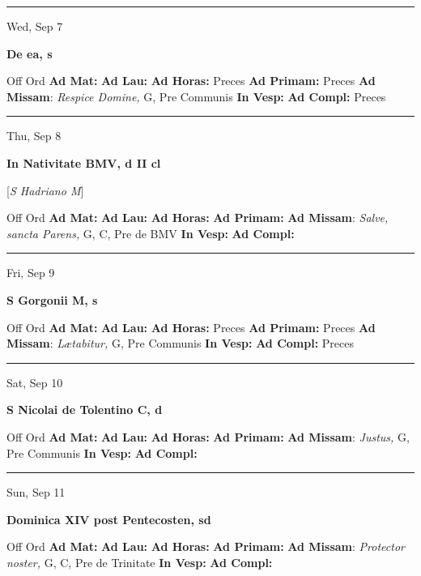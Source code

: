 \documentclass[letterpaper, 10pt]{article}
\begin{document}
\hrule
\begin{center}
Wed, Sep 7
\end{center}\textbf{ \large De ea, \textnormal{\normalsize s}}
\begin{justify}
Off Ord
\textbf{Ad Mat: }
\textbf{Ad Lau: }
\textbf{Ad Horas: }Preces
\textbf{Ad Primam: }Preces
\textbf{Ad Missam}: \textit{Respice Domine,} G, Pre Communis
\textbf{In Vesp: }
\textbf{Ad Compl: }Preces\end{justify}



\hrule
\begin{center}
Thu, Sep 8
\end{center}\textbf{ \large In Nativitate BMV, \textnormal{\normalsize d II cl}}

[\textit{S Hadriano M}]
\begin{justify}
Off Ord
\textbf{Ad Mat: }
\textbf{Ad Lau: }
\textbf{Ad Horas: }
\textbf{Ad Primam: }
\textbf{Ad Missam}: \textit{Salve, sancta Parens,} G, C, Pre de BMV
\textbf{In Vesp: }
\textbf{Ad Compl: }\end{justify}



\hrule
\begin{center}
Fri, Sep 9
\end{center}\textbf{ \large S Gorgonii M, \textnormal{\normalsize s}}
\begin{justify}
Off Ord
\textbf{Ad Mat: }
\textbf{Ad Lau: }
\textbf{Ad Horas: }Preces
\textbf{Ad Primam: }Preces
\textbf{Ad Missam}: \textit{Lætabitur,} G, Pre Communis
\textbf{In Vesp: }
\textbf{Ad Compl: }Preces\end{justify}



\hrule
\begin{center}
Sat, Sep 10
\end{center}\textbf{ \large S Nicolai de Tolentino C, \textnormal{\normalsize d}}
\begin{justify}
Off Ord
\textbf{Ad Mat: }
\textbf{Ad Lau: }
\textbf{Ad Horas: }
\textbf{Ad Primam: }
\textbf{Ad Missam}: \textit{Justus,} G, Pre Communis
\textbf{In Vesp: }
\textbf{Ad Compl: }\end{justify}



\hrule
\begin{center}
Sun, Sep 11
\end{center}\textbf{ \large Dominica XIV post Pentecosten, \textnormal{\normalsize sd}}
\begin{justify}
Off Ord
\textbf{Ad Mat: }
\textbf{Ad Lau: }
\textbf{Ad Horas: }
\textbf{Ad Primam: }
\textbf{Ad Missam}: \textit{Protector noster,} G, C, Pre de Trinitate
\textbf{In Vesp: }
\textbf{Ad Compl: }\end{justify}
\end{document}
